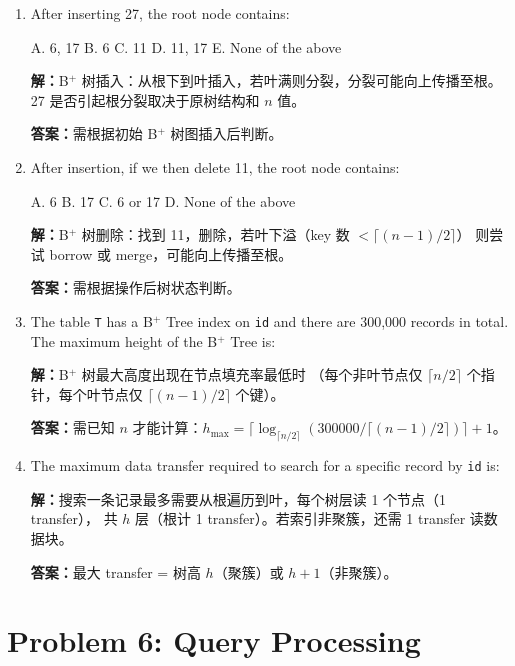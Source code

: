 \documentclass[11pt,a4paper]{article}
\newcommand{\solution}{\par\noindent\textcolor{ansblue}{\textbf{解：}}}
\newcommand{\answer}{\par\noindent\textcolor{ansred}{\textbf{答案：}}}
\begin{document}
\begin{enumerate}[leftmargin=*,itemsep=6pt]

\item After inserting 27, the root node contains:

  A. 6, 17 \quad B. 6 \quad C. 11 \quad D. 11, 17 \quad E. None of the above

  \solution B$^+$ 树插入：从根下到叶插入，若叶满则分裂，分裂可能向上传播至根。
  27 是否引起根分裂取决于原树结构和 $n$ 值。

  \answer 需根据初始 B$^+$ 树图插入后判断。

\item After insertion, if we then delete 11, the root node contains:

  A. 6 \quad B. 17 \quad C. 6 or 17 \quad D. None of the above

  \solution B$^+$ 树删除：找到 11，删除，若叶下溢（key 数 $< \lceil (n-1)/2\rceil$）
  则尝试 borrow 或 merge，可能向上传播至根。

  \answer 需根据操作后树状态判断。

\item The table \texttt{T} has a B$^+$ Tree index on \texttt{id} and there
  are 300,000 records in total. The maximum height of the B$^+$ Tree is:
  \underline{\hspace{2cm}}

  \solution B$^+$ 树最大高度出现在节点填充率最低时
  （每个非叶节点仅 $\lceil n/2 \rceil$ 个指针，每个叶节点仅
  $\lceil (n-1)/2 \rceil$ 个键）。

  \answer 需已知 $n$ 才能计算：$h_{\max} = \lceil
  \log_{\lceil n/2 \rceil}(300000 / \lceil (n-1)/2 \rceil) \rceil + 1$。

\item The maximum data transfer required to search for a specific record by
  \texttt{id} is: \underline{\hspace{2cm}}

  \solution 搜索一条记录最多需要从根遍历到叶，每个树层读 1 个节点（1 transfer），
  共 $h$ 层（根计 1 transfer）。若索引非聚簇，还需 1 transfer 读数据块。

  \answer 最大 transfer = \textcolor{ansred}{树高 $h$（聚簇）或 $h+1$（非聚簇）}。

\end{enumerate}

\section*{Problem 6: Query Processing}
\end{document}
